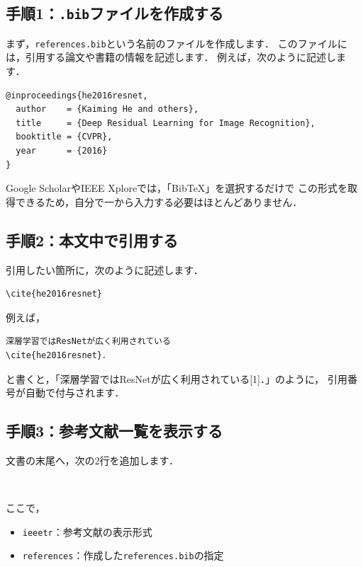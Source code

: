 \documentclass[a4paper,twocolumn]{ltjsarticle}
\begin{document}
\subsection*{手順1：\texttt{.bib}ファイルを作成する}
まず，\texttt{references.bib}という名前のファイルを作成します．
このファイルには，引用する論文や書籍の情報を記述します．
例えば，次のように記述します．

\begin{lstlisting}[language={}]
@inproceedings{he2016resnet,
  author    = {Kaiming He and others},
  title     = {Deep Residual Learning for Image Recognition},
  booktitle = {CVPR},
  year      = {2016}
}
\end{lstlisting}

Google ScholarやIEEE Xploreでは，「BibTeX」を選択するだけで
この形式を取得できるため，自分で一から入力する必要はほとんどありません．

\subsection*{手順2：本文中で引用する}
引用したい箇所に，次のように記述します．

\begin{verbatim}
\cite{he2016resnet}
\end{verbatim}

例えば，

\begin{verbatim}
深層学習ではResNetが広く利用されている
\cite{he2016resnet}．
\end{verbatim}

と書くと，「深層学習ではResNetが広く利用されている[1]．」のように，
引用番号が自動で付与されます．

\subsection*{手順3：参考文献一覧を表示する}
文書の末尾へ，次の2行を追加します．

\begin{verbatim}


\end{verbatim}

ここで，

\begin{itemize}
    \item \texttt{ieeetr}：参考文献の表示形式
    \item \texttt{references}：作成した\texttt{references.bib}の指定
\end{itemize}
\end{document}
